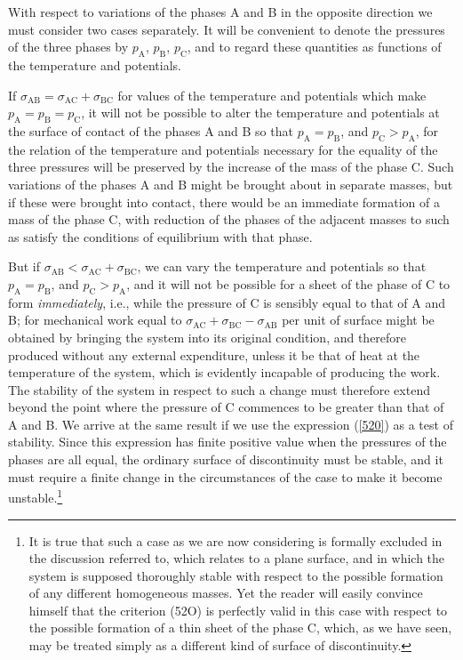 \documentclass[12pt]{article}
\begin{document}
{With respect to variations of the phases A and B in the opposite direction we must consider two cases separately. It will be convenient to denote the pressures of the three phases by $p_\text{A}$, $p_\text{B}$, $p_\text{C}$, and to regard these quantities as functions of the temperature and potentials.

If $\sigma_{\text{AB}} = \sigma_{\text{AC}} + \sigma_{\text{BC}}$ for values of the temperature and potentials which make $p_\text{A}=p_\text{B}=p_\text{C}$, it will not be possible to alter the temperature and potentials at the surface of contact of the phases A and B so that $p_\text{A}=p_\text{B}$, and $p_\text{C}>p_\text{A}$, for the relation of the temperature and potentials necessary for the equality of the three pressures will be preserved by the increase of the mass of the phase C. Such variations of the phases A and B might be brought about in separate masses, but if these were brought into contact, there would be an immediate formation of a mass of the phase C, with reduction of the phases of the adjacent masses to such as satisfy the conditions of equilibrium with that phase.

But if $\sigma_{\text{AB}} < \sigma_{\text{AC}} + \sigma_{\text{BC}}$, we can vary the temperature and potentials so that $p_\text{A}=p_\text{B}$, and $p_\text{C}>p_\text{A}$, and it will not be possible for a sheet of the phase of C to form \textit{immediately}, i.e., while the pressure of C is sensibly equal to that of A and B; for mechanical work equal to $\sigma_{\text{AC}} + \sigma_{\text{BC}} - \sigma_{\text{AB}}$ per unit of surface might be obtained by bringing the system into its original condition, and therefore produced without any external expenditure, unless it be that of heat at the temperature of the system, which is evidently incapable of producing the work. The stability of the system in respect to such a change must therefore extend beyond the point where the pressure of C commences to be greater than that of A and B. We arrive at the same result if we use the expression (\ref{520}) as a test of stability. Since this expression has finite positive value when the pressures of the phases are all equal, the ordinary surface of discontinuity must be stable, and it must require a finite change in the circumstances of the case to make it become unstable.\footnote{It is true that such a case as we are now considering is formally excluded in the discussion referred to, which relates to a plane surface, and in which the system is supposed thoroughly stable with respect to the possible formation of any different homogeneous masses. Yet the reader will easily convince himself that the criterion (52O) is perfectly valid in this case with respect to the possible formation of a thin sheet of the phase C, which, as we have seen, may be treated simply as a different kind of surface of discontinuity.}

}
\end{document}

